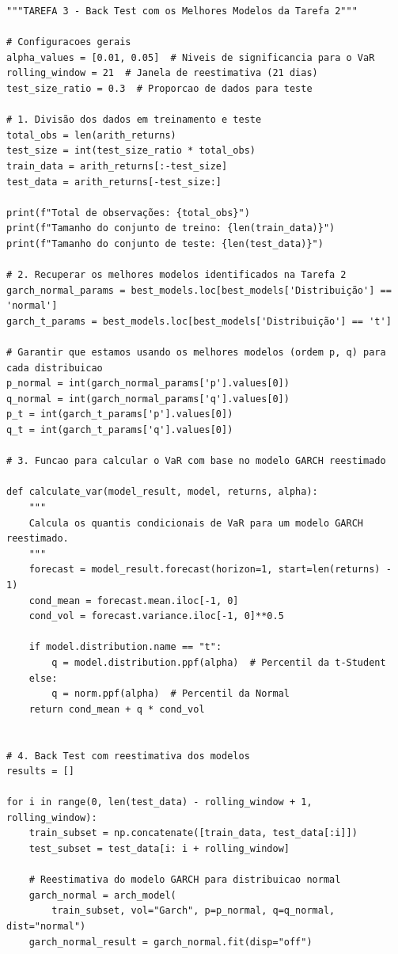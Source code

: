 \documentclass[a4paper, 12pt]{article}
\begin{document}
\begin{lstlisting}[style=python]
"""TAREFA 3 - Back Test com os Melhores Modelos da Tarefa 2"""

# Configuracoes gerais
alpha_values = [0.01, 0.05]  # Niveis de significancia para o VaR
rolling_window = 21  # Janela de reestimativa (21 dias)
test_size_ratio = 0.3  # Proporcao de dados para teste

# 1. Divisão dos dados em treinamento e teste
total_obs = len(arith_returns)
test_size = int(test_size_ratio * total_obs)
train_data = arith_returns[:-test_size]
test_data = arith_returns[-test_size:]

print(f"Total de observações: {total_obs}")
print(f"Tamanho do conjunto de treino: {len(train_data)}")
print(f"Tamanho do conjunto de teste: {len(test_data)}")

# 2. Recuperar os melhores modelos identificados na Tarefa 2
garch_normal_params = best_models.loc[best_models['Distribuição'] == 'normal']
garch_t_params = best_models.loc[best_models['Distribuição'] == 't']

# Garantir que estamos usando os melhores modelos (ordem p, q) para cada distribuicao
p_normal = int(garch_normal_params['p'].values[0])
q_normal = int(garch_normal_params['q'].values[0])
p_t = int(garch_t_params['p'].values[0])
q_t = int(garch_t_params['q'].values[0])

# 3. Funcao para calcular o VaR com base no modelo GARCH reestimado

def calculate_var(model_result, model, returns, alpha):
    """
    Calcula os quantis condicionais de VaR para um modelo GARCH reestimado.
    """
    forecast = model_result.forecast(horizon=1, start=len(returns) - 1)
    cond_mean = forecast.mean.iloc[-1, 0]
    cond_vol = forecast.variance.iloc[-1, 0]**0.5

    if model.distribution.name == "t":
        q = model.distribution.ppf(alpha)  # Percentil da t-Student
    else:
        q = norm.ppf(alpha)  # Percentil da Normal
    return cond_mean + q * cond_vol


# 4. Back Test com reestimativa dos modelos
results = []

for i in range(0, len(test_data) - rolling_window + 1, rolling_window):
    train_subset = np.concatenate([train_data, test_data[:i]])
    test_subset = test_data[i: i + rolling_window]

    # Reestimativa do modelo GARCH para distribuicao normal
    garch_normal = arch_model(
        train_subset, vol="Garch", p=p_normal, q=q_normal, dist="normal")
    garch_normal_result = garch_normal.fit(disp="off")


\end{lstlisting}
\end{document}
